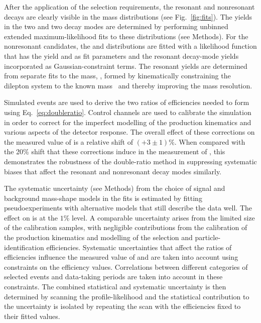After the application of the selection requirements, the resonant and nonresonant decays are clearly visible in the mass distributions (see Fig.~\ref{fig:fits}). The yields  in the two \BuKll and two \BuJpsiKll decay modes are determined by performing unbinned extended maximum-likelihood fits to these distributions (see Methods). 
For the nonresonant candidates, the \mKee and \mKmm distributions are fitted with a likelihood function that has the \BuKmm yield and \RK as fit parameters and the resonant decay-mode yields incorporated as Gaussian-constraint terms.
The resonant yields are determined from separate fits
to the mass, \mKllconst, formed by kinematically constraining the dilepton system to the known \jpsi mass~\cite{PDG2020} and thereby improving the mass resolution.



Simulated events are used to derive the two ratios of efficiencies needed to form \RK using Eq.~\eqref{eq:doubleratio}. Control channels are used to calibrate the simulation in order to correct for the imperfect modelling of the \Bu production kinematics and various aspects of the detector response. The overall effect of these corrections on the measured value of \RK is a relative shift of $(+3\pm1)\%$.
When compared with the 20\% shift that these corrections induce in the measurement of \rjpsi, this demonstrates the robustness of the double-ratio method in suppressing systematic biases that affect the resonant and nonresonant decay modes similarly.

The systematic uncertainty (see Methods) from the choice of signal and background mass-shape models in the fits is estimated by fitting pseudoexperiments with alternative models that still describe the data well. The effect on \RK is at the $1\%$ level. A  comparable uncertainty arises from the limited size of the calibration samples, with negligible contributions from the calibration of the \Bu production kinematics and modelling of the selection and particle-identification efficiencies. Systematic uncertainties that affect the ratios of efficiencies influence the measured value of \RK and are taken into account using constraints on the efficiency values. Correlations between different categories of selected events and data-taking periods are taken into account in these constraints. The combined statistical and systematic uncertainty is then determined by scanning the profile-likelihood and the statistical contribution to the uncertainty is isolated by repeating the scan with the efficiencies fixed to their fitted values.  

